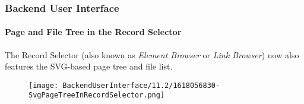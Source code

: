 %

\begin{frame}[fragile]
	\frametitle{Backend User Interface}
	\framesubtitle{Page and File Tree in the Record Selector}

	The Record Selector (also known as \textit{Element Browser} or \textit{Link Browser})
	now also features the SVG-based page tree and file list.

	\begin{figure}
		\texttt{[image: BackendUserInterface/11.2/1618056830-SvgPageTreeInRecordSelector.png]}
	\end{figure}

\end{frame}

